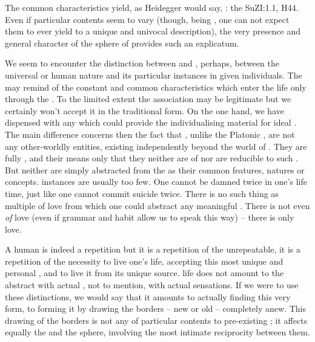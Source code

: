   The common characteristics yield, as Heidegger would say, :
  the \citet{explicata to which the analytic of Dasein gives rise, obtained by
    considering Dasein's existence-structure}{SuZ}{I:1.1, H44}.  Even if
  particular contents seem to vary (though, being , one can not
  expect them to ever yield to a unique and univocal description), the very
  presence and general character of the sphere of  provides such
  an explicatum.



\label{sub:formMatter}

\pa We seem to encounter the distinction between
 and , perhaps, between the universal  or
human nature and
its particular instances in given individuals. The  may remind of
the constant and common characteristics which enter the life only through the
. To the limited extent the association may be legitimate
but we certainly won't accept it in the traditional form.
On the one hand, we have dispensed with any
 which could provide the individualising material for ideal
. The main difference concerns then the fact that ,
unlike the Platonic , are not any 
other-worldly entities, existing independently beyond the world of
. They are  fully , and
their  means only that they neither are  of
 nor are reducible to such . 
But neither are  simply abstracted from the
 as their common features, natures or
concepts.  instances are usually too few. One
cannot be damned twice in one's life time, just like one cannot commit suicide
twice. There is 
no such thing as multiple  of love from which one could abstract
any meaningful . There is not even 
 {\em of} love (even if grammar and habit
allow us to speak this way) -- there is only  love. 

\pa
A human  is indeed a repetition but it is a
repetition of the unrepeatable, it is a repetition of the necessity to live
one's life, accepting this most unique and personal , and to live it
from its unique source.  life does not amount to 
the abstract  with actual , not to mention, with actual
sensations. If we were to use these distinctions, we would say that it amounts
to actually finding this very form, to forming it by drawing the borders
-- new or old -- completely anew. This drawing of the borders is not any
 of particular contents to pre-existing ; it affects
equally the  and the  sphere, involving the most
intimate reciprocity between them.

